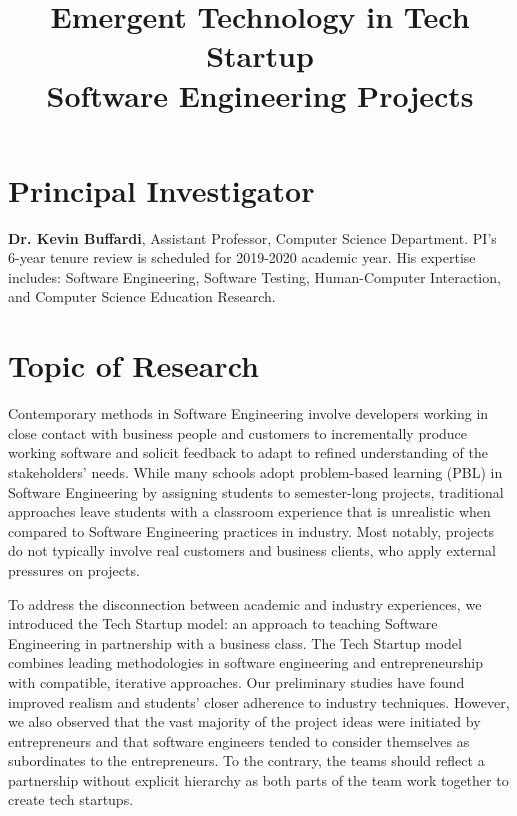 \documentclass[letterpaper]{article}
\title{Emergent Technology in Tech Startup \protect\\ Software Engineering Projects}
\author{}
\date{}
\begin{document}
  \maketitle
  \section{Principal Investigator}

    \textbf{Dr. Kevin Buffardi}, Assistant Professor, Computer Science 
    Department. PI's 6-year tenure review is scheduled for 2019-2020 academic 
    year. His expertise includes: Software Engineering, Software Testing, 
    Human-Computer Interaction, and Computer Science Education Research.

  \section{Topic of Research}
  Contemporary methods in Software Engineering involve developers working in close contact with business people and customers to incrementally produce working software and solicit feedback to adapt to refined understanding of the stakeholders' needs. While many schools adopt problem-based learning (PBL) in Software Engineering by assigning students to semester-long projects, traditional approaches leave students with a classroom experience that is unrealistic when compared to Software Engineering practices in industry. Most notably, projects do not typically involve real customers and business clients, who apply external pressures on projects. 

  To address the disconnection between academic and industry experiences, we introduced the Tech Startup model: an approach to teaching Software Engineering in partnership with a business class. The Tech Startup model combines leading methodologies in software engineering and entrepreneurship with compatible, iterative approaches. Our preliminary studies have found improved realism and students' closer adherence to industry techniques. However, we also observed that the vast majority of the project ideas were initiated by entrepreneurs and that software engineers tended to consider themselves as subordinates to the entrepreneurs. To the contrary, the teams should reflect a partnership without explicit hierarchy as both parts of the team work together to create tech startups.
\end{document}
